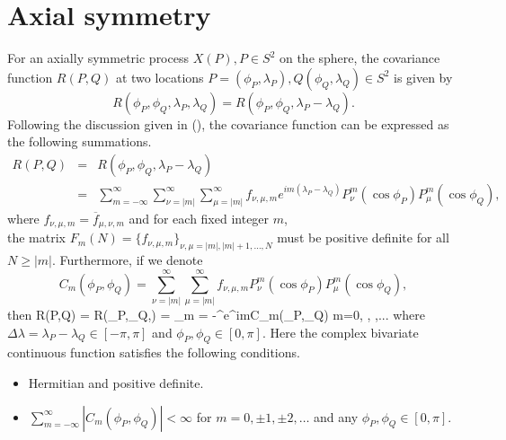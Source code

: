 		
		\section{Axial symmetry}

For an axially symmetric process $X(P), P \in S^2$ on the sphere, the covariance function $R(P,Q)$ at two locations $P=(\phi_P, \lambda_P), Q(\phi_Q,\lambda_Q) \in S^2$ is given by 					 \[
R(\phi_P, \phi_Q, \lambda_P, \lambda_Q) = R(\phi_P, \phi_Q, \lambda_P-\lambda_Q).
\]
Following the discussion given in (\cite{Huang2012}), the covariance function can be expressed as the following summations.					
		\begin{eqnarray} \label{axially-symmetry-cov}
			R(P,Q)  & = & R(\phi_P, \phi_Q, \lambda_P-\lambda_Q) \nonumber \\
			& = & \sum_{m=-\infty}^{\infty} \sum_{\nu=|m|}^\infty \sum_{\mu=|m|}^\infty f_{\nu,\mu,m} e^{im (\lambda_P-\lambda_Q)} P_{\nu}^m(\cos \phi_P) P_{\mu}^m (\cos \phi_Q),
		\end{eqnarray}
where $f_{\nu,\mu, m} = \overline{f}_{\mu, \nu, m}$ and for each fixed integer $m$,\\ the matrix $F_m(N) = \{ f_{\nu,\mu,m} \}_{\nu,\mu=|m|,|m|+1, \ldots, N }$ must be positive definite for all $N \ge |m|$. Furthermore, if we denote
\[
C_m(\phi_P, \phi_Q) = \sum_{\nu=|m|}^\infty \sum_{\mu=|m|}^\infty f_{\nu,\mu,m} P_{\nu}^m(\cos \phi_P) P_{\mu}^m (\cos \phi_Q),
\]
then 				
		\beq \label{R(PQ)-01}
		R(P,Q) = R(\phi_P,\phi_Q,\Delta\lambda) = \sum_{m = -\infty}^{\infty}e^{im\Delta\lambda}C_m(\phi_P,\phi_Q) \quad m=0, , ,...
		\eeq
where $\Delta\lambda = \lambda_P - \lambda_Q \in [-\pi, \pi]$ and $\phi_P, \phi_Q \in [0,\pi]$. Here the complex bivariate continuous function \Cm satisfies the following conditions.

		\begin{itemize}
			\item Hermitian and positive definite.
			\item $\sum_{m = -\infty}^{\infty}|C_m(\phi_P,\phi_Q)|<\infty$ for $m=0,\pm 1, \pm  2, \ldots$ and any $\phi_P, \phi_Q \in [0, \pi]$.
		\end{itemize}
				
